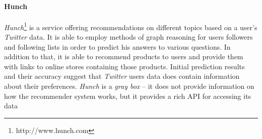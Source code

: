 \paragraph{Hunch}
\textit{Hunch}\footnote{http://www.hunch.com} is a service offering recommendations on different topics based on a user's
\textit{Twitter} data. It is able to employ methods of graph reasoning for users followers and following lists
in order to predict his answers to various questions. In addition to that, it is able to recommend products
to users and provide them with links to online stores containing those products.
Initial prediction results and their accuracy suggest that
\textit{Twitter} users data does contain information about their preferences. \textit{Hunch} is a \textit{gray box}
--  it does not provide information on how the recommender system works, but it provides a rich
API for accessing its data
